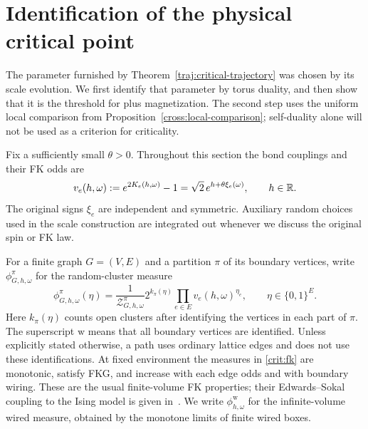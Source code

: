 \section{Identification of the physical critical point}
\label{sec:criticality}

The parameter furnished by Theorem~\ref{traj:critical-trajectory} was
chosen by its scale evolution. We first identify that parameter by torus
duality, and then show that it is the threshold for plus magnetization.
The second step uses the uniform local comparison from
Proposition~\ref{cross:local-comparison}; self-duality alone will not be
used as a criterion for criticality.

Fix a sufficiently small $\theta>0$. Throughout this section the bond
couplings and their FK odds are
\begin{equation}
 v_e(h,\omega):=e^{2K_e(h,\omega)}-1
       =\sqrt2\,e^{h+\theta\xi_e(\omega)},
 \qquad h\in\mathbb R.
 \label{crit:odds}
\end{equation}
The original signs $\xi_e$ are independent and symmetric. Auxiliary
random choices used in the scale construction are integrated out whenever
we discuss the original spin or FK law.

For a finite graph $G=(V,E)$ and a partition $\pi$ of its boundary
vertices, write $\phi_{G,h,\omega}^{\pi}$ for the random-cluster measure
\begin{equation}
 \phi_{G,h,\omega}^{\pi}(\eta)
 =\frac{1}{\mathcal Z_{G,h,\omega}^{\pi}}
       2^{k_\pi(\eta)}\prod_{e\in E}v_e(h,\omega)^{\eta_e},
 \qquad \eta\in\{0,1\}^{E}.
 \label{crit:fk}
\end{equation}
Here $k_\pi(\eta)$ counts open clusters after identifying the vertices
in each part of $\pi$. The superscript $\mathrm w$ means that all boundary
vertices are identified. Unless explicitly stated otherwise, a path uses
ordinary lattice edges and does not use these identifications. At fixed
environment the measures in \eqref{crit:fk} are monotonic, satisfy FKG,
and increase with each edge odds and with boundary wiring. These are the
usual finite-volume FK properties; their Edwards--Sokal coupling to the
Ising model is given in~\cite{ES}.
We write $\phi_{h,\omega}^{\mathrm w}$ for the infinite-volume wired
measure, obtained by the monotone limits of finite wired boxes.

